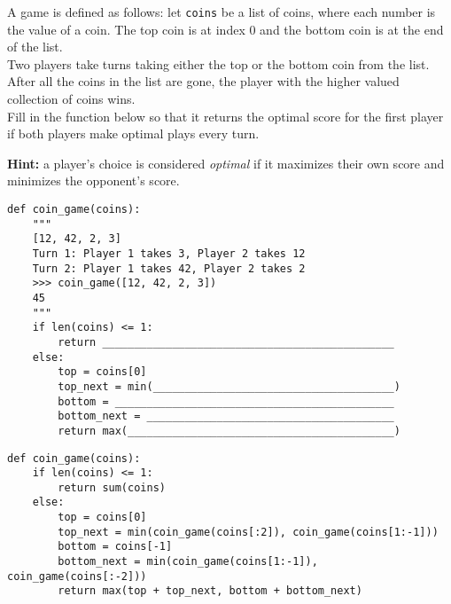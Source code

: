 \begin{blocksection}
\question A game is defined as follows: let \lstinline{coins} be a list of coins, where each number is the value of a coin.
The top coin is at index 0 and the bottom coin is at the end of the list.
\\
Two players take turns taking either the top or the bottom coin from the list.
After all the coins in the list are gone, the player with the higher valued collection of coins wins.
\\
Fill in the function below so that it returns the optimal score for the first player if both players make optimal plays every turn.

\textbf{Hint:} a player's choice is considered \textit{optimal} if it maximizes their own score and minimizes the opponent's score.  \\

\begin{lstlisting}
def coin_game(coins):
    """
    [12, 42, 2, 3]
    Turn 1: Player 1 takes 3, Player 2 takes 12
    Turn 2: Player 1 takes 42, Player 2 takes 2
    >>> coin_game([12, 42, 2, 3])
    45
    """
    if len(coins) <= 1:
        return ______________________________________________
    else:
        top = coins[0]
        top_next = min(______________________________________)
        bottom = ____________________________________________
        bottom_next = _______________________________________
        return max(__________________________________________)
\end{lstlisting}
\end{blocksection}

\begin{solution}[0in]
\begin{lstlisting}
def coin_game(coins):
    if len(coins) <= 1:
        return sum(coins)
    else:
        top = coins[0]
        top_next = min(coin_game(coins[:2]), coin_game(coins[1:-1]))
        bottom = coins[-1]
        bottom_next = min(coin_game(coins[1:-1]), coin_game(coins[:-2]))
        return max(top + top_next, bottom + bottom_next)
\end{lstlisting}
\end{solution}



